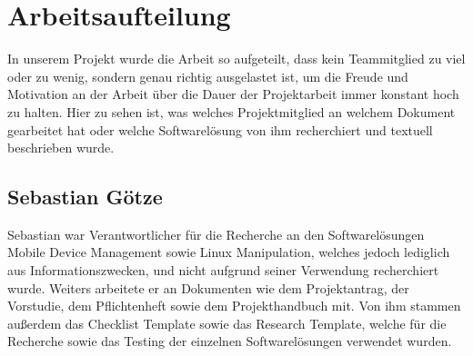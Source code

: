 \section{Arbeitsaufteilung}
In unserem Projekt wurde die Arbeit so aufgeteilt, dass kein Teammitglied zu viel oder zu wenig, sondern genau richtig ausgelastet ist, um die Freude und Motivation an der Arbeit über die Dauer der Projektarbeit immer konstant hoch zu halten. Hier zu sehen ist, was welches Projektmitglied an welchem Dokument gearbeitet hat oder welche Softwarelösung von ihm recherchiert und textuell beschrieben wurde.

\subsection{Sebastian Götze}
Sebastian war Verantwortlicher für die Recherche an den Softwarelösungen Mobile Device Management sowie Linux Manipulation, welches jedoch lediglich aus Informationszwecken, und nicht aufgrund seiner Verwendung recherchiert wurde. Weiters arbeitete er an Dokumenten wie dem Projektantrag, der Vorstudie, dem Pflichtenheft sowie dem Projekthandbuch mit. Von ihm stammen außerdem das Checklist Template sowie das Research Template, welche für die Recherche sowie das Testing der einzelnen Softwarelösungen verwendet wurden.
